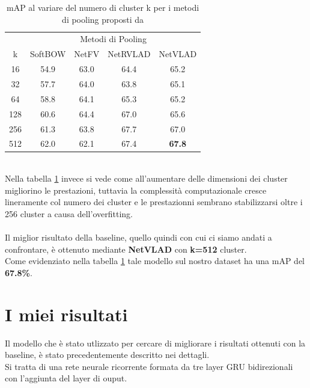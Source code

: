 \begin{table}[ht]
\label{table: baselinek16to512}
\caption{mAP al variare del numero di cluster k per i metodi di pooling proposti da \citet{MiechPooling}}
\centering
\begin{tabular}{c| | c|c|c |  c}
&\multicolumn{4}{c}{Metodi di Pooling} \\
k & SoftBOW & NetFV & NetRVLAD & NetVLAD \\
\hline
16& 54.9 & 63.0 & 64.4 & 65.2 \\
32 & 57.7 & 64.0 & 63.8 & 65.1 \\
64& 58.8 &  64.1 & 65.3 & 65.2 \\
128& 60.6 & 64.4 & 67.0 & 65.6 \\
256& 61.3 & 63.8 & 67.7 & 67.0 \\
512 & 62.0 & 62.1 & 67.4 & \textbf{67.8} \\[1ex]

\end{tabular}
\end{table}
\\Nella tabella \ref{table: baselinek16to512} invece si vede come all'aumentare delle dimensioni dei cluster migliorino le prestazioni, tuttavia la complessità computazionale cresce lineramente col numero dei cluster e le prestazionni sembrano stabilizzarsi oltre i 256 cluster a causa dell'overfitting.\\
\\
Il miglior risultato della baseline, quello quindi con cui ci siamo andati a confrontare, è ottenuto mediante \textbf{NetVLAD} con \textbf{k=512} cluster.
\\Come evidenziato nella tabella \ref{table: baselinek16to512} tale modello sul nostro dataset ha una mAP del \textbf{67.8\%}.
\section{I miei risultati}
Il modello che è stato utlizzato per cercare di migliorare i risultati ottenuti con la baseline, è stato precedentemente descritto nei dettagli.
\\Si tratta di una rete neurale ricorrente formata da tre layer GRU bidirezionali con l'aggiunta del layer di ouput.
